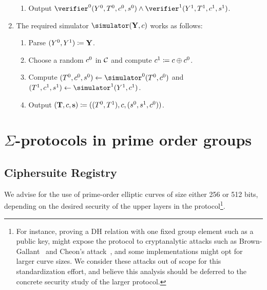 \documentclass[runningheads,11pt]{article}
\begin{document}
\begin{enumerate}
\begin{enumerate}
      \item
	    Output $\verifier^0(\statement^0, \commitment^0,c^0,s^0)\land\verifier^1(\statement^1, \commitment^1,c^1,s^1)$.
    \end{enumerate}
  \item
    The required simulator $\simulator(\vec \statement,\challenge)$ works as follows:
    \begin{enumerate}
      \item
        Parse $(Y^0,Y^1)\coloneqq \mathbf {Y}$.
      \item
        Choose a random $c^0$ in $\mathcal{C}$ and compute $c^1\coloneqq c \oplus c^0$.
      \item
        Compute $(\commitment^0,\challenge^0, \response^0)\gets\simulator^0(\commitment^0,\challenge^0)$ and $(\commitment^1,\challenge^1,\response^1)\gets\simulator^1(\statement^1,\challenge^1)$.
      \item
        Output $(\mathbf {T},c,\mathbf s)\coloneqq ((T^0,T^1),c,(s^0,s^1,c^0))$.
    \end{enumerate}
\end{enumerate}

\section{$\Sigma$-protocols in prime order groups}
\label{sec:instantiation}



\subsection{Ciphersuite Registry}
 We advise for the use of prime-order elliptic curves of size either 256 or 512 bits, depending on the desired security of the upper layers in the protocol\footnote{For instance, proving a DH relation with one fixed group element such as a public key, might expose the protocol to cryptanalytic attacks such as Brown-Gallant~\cite{EPRINT:BroGal04} and Cheon’s attack~\cite{EC:Cheon06}, and some implementations might opt for larger curve sizes. We consider these attacks out of scope for this standardization effort, and believe this analysis should be deferred to the concrete security study of the larger protocol.}.
\end{document}
